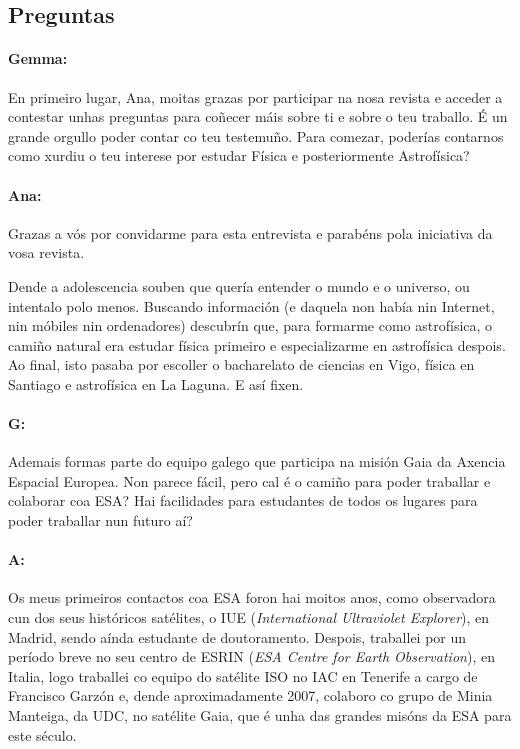 \begin{refsection}
\begin{multicols}{2}
\subsection*{Preguntas}

\paragraph{Gemma:} En primeiro lugar, Ana, moitas grazas por participar na nosa
revista e acceder a contestar unhas preguntas para coñecer máis sobre ti e
sobre o teu traballo. É un grande orgullo poder contar co teu testemuño. Para
comezar, poderías contarnos como xurdiu o teu interese por estudar Física e
posteriormente Astrofísica?

\paragraph{Ana:} Grazas a vós por convidarme para esta entrevista e parabéns pola
iniciativa da vosa revista.

Dende a adolescencia souben que quería entender o mundo e o universo, ou
intentalo polo menos. Buscando información (e daquela non había nin Internet,
nin móbiles nin ordenadores) descubrín que, para formarme como astrofísica, o
camiño natural era estudar física primeiro e especializarme en astrofísica
despois. Ao final, isto pasaba por escoller o bacharelato de ciencias en Vigo,
física en Santiago e astrofísica en La Laguna. E así fixen.

\paragraph{G:} Ademais formas parte do equipo galego que participa na misión Gaia
da Axencia Espacial Europea. Non parece fácil, pero cal é o camiño para poder
traballar e colaborar coa ESA? Hai facilidades para estudantes de todos os
lugares para poder traballar nun futuro aí?

\paragraph{A:} Os meus primeiros contactos coa ESA foron hai moitos anos, como
observadora cun dos seus históricos satélites, o IUE (\textit{International
Ultraviolet Explorer}), en Madrid, sendo aínda estudante de doutoramento.
Despois, traballei por un período breve no seu centro de ESRIN (\textit{ESA
Centre for Earth Observation}), en Italia, logo traballei co equipo do satélite
ISO no IAC en Tenerife a cargo de Francisco Garzón e, dende aproximadamente
2007, colaboro co grupo de Minia Manteiga, da UDC, no satélite Gaia, que é unha
das grandes misóns da ESA para este século.


\end{multicols}
\end{refsection}
